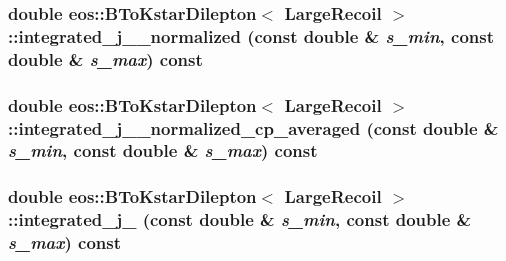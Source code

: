 \label{classeos_1_1BToKstarDilepton_3_01LargeRecoil_01_4_a55d2a76ae67afb9a549aea69b76af846}
\hypertarget{classeos_1_1BToKstarDilepton_3_01LargeRecoil_01_4_af61c16f0cb7147d9cb8fbde1aa494c41}{
\subsubsection[{integrated\_\-j\_\-3\_\-normalized}]{\setlength{\rightskip}{0pt plus 5cm}double eos::BToKstarDilepton$<$ {\bf LargeRecoil} $>$::integrated\_\-j\_\_\-normalized (const double \& {\em s\_\-min}, \/  const double \& {\em s\_\-max}) const}}
\label{classeos_1_1BToKstarDilepton_3_01LargeRecoil_01_4_af61c16f0cb7147d9cb8fbde1aa494c41}
\hypertarget{classeos_1_1BToKstarDilepton_3_01LargeRecoil_01_4_a68617d15999d9b87a9f3105ccc7c0d92}{
\subsubsection[{integrated\_\-j\_\-3\_\-normalized\_\-cp\_\-averaged}]{\setlength{\rightskip}{0pt plus 5cm}double eos::BToKstarDilepton$<$ {\bf LargeRecoil} $>$::integrated\_\-j\_\_\-normalized\_\-cp\_\-averaged (const double \& {\em s\_\-min}, \/  const double \& {\em s\_\-max}) const}}
\label{classeos_1_1BToKstarDilepton_3_01LargeRecoil_01_4_a68617d15999d9b87a9f3105ccc7c0d92}
\hypertarget{classeos_1_1BToKstarDilepton_3_01LargeRecoil_01_4_ad1b9d4ed45d58d3ba4ee5b53d4e4657f}{
\subsubsection[{integrated\_\-j\_\-4}]{\setlength{\rightskip}{0pt plus 5cm}double eos::BToKstarDilepton$<$ {\bf LargeRecoil} $>$::integrated\_\-j\_ (const double \& {\em s\_\-min}, \/  const double \& {\em s\_\-max}) const}}
